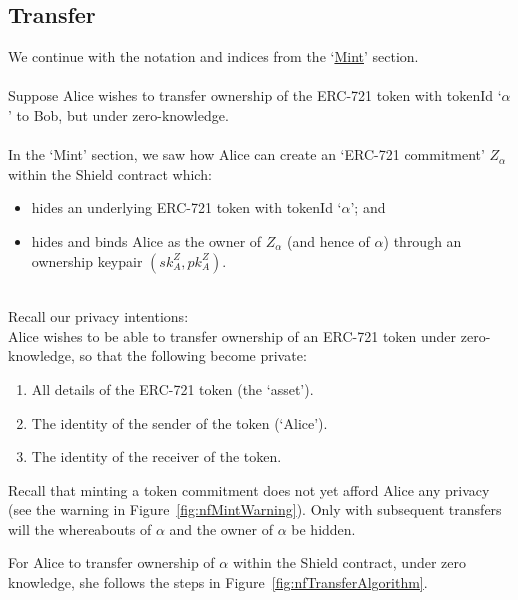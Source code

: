 \subsection{Transfer}
\label{sec:721Transfer}

\sectlof
We continue with the notation and indices from the `\hyperref[sec:Mint]{Mint}' section.\\
\\
Suppose Alice wishes to transfer ownership of the ERC-721 token with tokenId `$\alpha$' to Bob, but under zero-knowledge.\\
\\
In the `Mint' section, we saw how Alice can create an `ERC-721 commitment' $Z_\alpha$ within the Shield contract which:
\begin{itemize}
  \item hides an underlying ERC-721 token with tokenId `$\alpha$'; and
  \item hides and binds Alice as the owner of $Z_\alpha$ (and hence of $\alpha$) through an ownership keypair $(sk_A^Z, pk_A^Z)$.
\end{itemize}
\ \\
Recall our privacy intentions:\\
Alice wishes to be able to transfer ownership of an ERC-721 token under zero-knowledge, so that the following become private:
	\begin{center}
		\begin{framed}
      \begin{enumerate}
        \item All details of the ERC-721 token (the `asset').
        \item The identity of the sender of the token (`Alice').
        \item The identity of the receiver of the token.
      \end{enumerate}
    \end{framed}
  \end{center}
Recall that minting a token commitment does not yet afford Alice any privacy (see the warning in Figure~\ref{fig:nfMintWarning}). Only with subsequent transfers will the whereabouts of $\alpha$ and the owner of $\alpha$ be hidden.

For Alice to transfer ownership of $\alpha$ within the Shield contract, under zero knowledge, she follows the steps in Figure~\ref{fig:nfTransferAlgorithm}.

